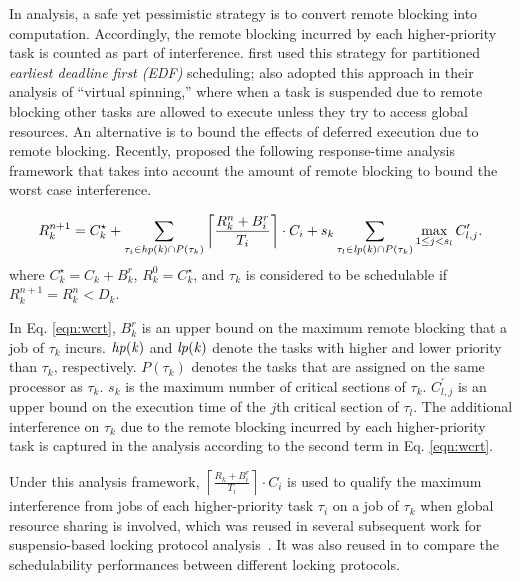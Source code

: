 In analysis, a safe yet pessimistic strategy is to convert remote blocking into computation. Accordingly, the remote blocking incurred by each higher-priority task is counted as part of interference. \citet{block-2007} first used this strategy for partitioned \emph{earliest deadline first (EDF)} scheduling;  \citet{lakshmanan-2009} also adopted this approach in their analysis of ``virtual spinning,'' where when a task is suspended due to remote blocking other tasks are allowed to execute unless they try to access global resources. An alternative is to bound the effects of deferred execution due to remote blocking. Recently, \citet{lakshmanan-2009} proposed the following response-time analysis framework that takes into account the amount of remote blocking to bound the worst case interference.

\begin{equation}
\label{eqn:wcrt}
R_k^{n+1} = C_k^{\star} + \sum_{\tau_i \in \mathit{hp(k)} \cap P(\tau_k)} \left \lceil \frac{R_k^n + B_i^r}{T_i} \right \rceil \cdot C_i + s_k \sum_{\tau_l \in \mathit{lp(k)} \cap P(\tau_k)} \max_{1 \leq j < s_l} C_{l,j}^{\prime}.  
\end{equation}
where $C_k^{\star} = C_k + B_k^r$, $R_k^0 = C_k^{\star}$, and $\tau_k$ is considered to be schedulable if $R_k^{n+1} = R_k^n < D_k$. 

In Eq. \ref{eqn:wcrt}, $B_k^r$ is an upper bound on the maximum remote blocking that a job of $\tau_k$ incurs. $\mathit{hp(k)}$ and $\mathit{lp(k)}$ denote the tasks with higher and lower priority than $\tau_k$, respectively. $P(\tau_k)$ denotes the tasks that are assigned on the same processor as $\tau_k$. $s_k$ is the maximum number of critical sections of $\tau_k$. $C_{l,j}^{\prime}$ is an upper bound on the execution time of the $j$th critical section of $\tau_l$. The additional interference on $\tau_k$ due to the remote blocking incurred by each higher-priority task is captured in the analysis according to the second term in Eq. \ref{eqn:wcrt}.

Under this analysis framework, $\left \lceil \frac{R_k + B_i^r}{T_i} \right \rceil \cdot C_i$ is used to qualify the maximum interference from jobs of each higher-priority task $\tau_i$ on a job of $\tau_k$ when global resource sharing is involved, which was reused in several subsequent work for suspensio-based locking protocol analysis~\cite{yang-2013,kim-2014,carminati-2014,yang-2014}. It was also reused in \cite{zeng-2011,bbb-2013,han-2014} to compare the schedulability performances between different locking protocols. 

